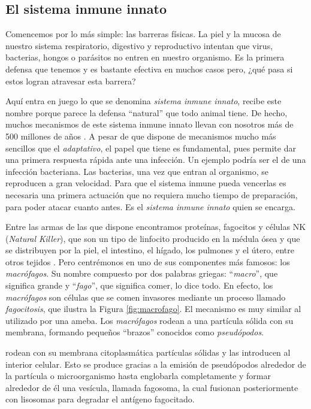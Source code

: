 \subsection{El sistema inmune innato}

Comencemos por lo más simple: las barreras físicas. La piel y la mucosa de nuestro sistema respiratorio, digestivo y reproductivo intentan que virus, bacterias, hongos o parásitos no entren en nuestro organismo. Es la primera defensa que tenemos y es bastante efectiva en muchos casos pero, ¿qué pasa si estos logran atravesar esta barrera?

Aquí entra en juego lo que se denomina \textit{sistema inmune innato}, recibe este nombre porque parece la defensa ``natural'' que todo animal tiene. De hecho, muchos mecanismos de este sistema inmune innato llevan con nosotros más de 500 millones de años \citep{theHowItWorks}. A pesar de que dispone de mecanismos mucho más sencillos que el \textit{adaptativo}, el papel que tiene es fundamental, pues permite dar una primera respuesta rápida ante una infección. Un ejemplo podría ser el de una infección bacteriana. Las bacterias, una vez que entran al organismo, se reproducen a gran velocidad. Para que el sistema inmune pueda vencerlas es necesaria una primera actuación que no requiera mucho tiempo de preparación, para poder atacar cuanto antes. Es el \textit{sistema inmune innato} quien se encarga. 

Entre las armas de las que dispone encontramos proteínas, fagocitos y células NK (\textit{Natural Killer}), que son un tipo de linfocito producido en la médula ósea y que se distribuyen por la piel, el intestino, el hígado, los pulmones y el útero, entre otros tejidos \citep{celulasNK}. Pero centrémonos en uno de sus componentes más famosos: los \textit{macrófagos}. Su nombre compuesto por dos palabras griegas: ``\textit{macro}'', que significa grande y ``\textit{fago}'', que significa comer, lo dice todo. En efecto, los \textit{macrófagos} son células que se comen invasores mediante un proceso llamado \textit{fagocitosis}, que ilustra la Figura \ref{fig:macrofago}. El mecanismo es muy similar al utilizado por una ameba. Los \textit{macrófagos} rodean a una partícula sólida con su membrana, formando pequeños ``brazos'' conocidos como \textit{pseudópodos}.

rodean con su membrana citoplasmática partículas sólidas y las introducen al interior celular. Esto se produce gracias a la emisión de pseudópodos alrededor de la partícula o microorganismo hasta englobarla completamente y formar alrededor de él una vesícula, llamada fagosoma, la cual fusionan posteriormente con lisosomas para degradar el antígeno fagocitado.

